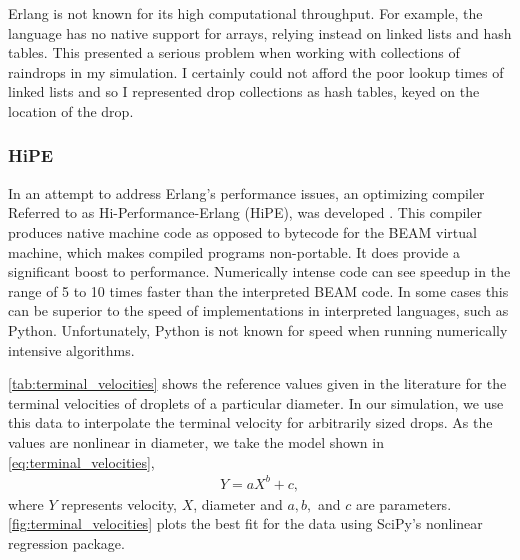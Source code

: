 \documentclass[twocolumn,a4paper,10pt]{article}
\begin{document}
Erlang is not known for its high computational throughput. For
example, the language has no native support for arrays, relying instead on
linked lists and hash tables. This presented a serious problem when working with
collections of raindrops in my simulation. I certainly could not afford the poor
lookup times of linked lists and so I represented drop collections as hash
tables, keyed on the location of the drop.

\subsubsection{HiPE}

In an attempt to address Erlang's performance issues, an optimizing compiler
Referred to as Hi-Performance-Erlang (HiPE), was developed \cite{hipe}. This
compiler produces native machine code as opposed to bytecode for the BEAM
virtual machine, which makes compiled programs non-portable. It does provide a
significant boost to performance. Numerically intense code can see speedup in
the range of 5 to 10 times faster than the interpreted BEAM code. In some cases
this can be superior to the speed of implementations in interpreted languages,
such as Python. Unfortunately, Python is not known for speed when running
numerically intensive algorithms.


\autoref{tab:terminal_velocities} shows the reference values given in the
literature for the terminal velocities of droplets of a particular diameter. In
our simulation, we use this data to interpolate the terminal velocity for
arbitrarily sized drops. As the values are nonlinear in diameter, we take the
model shown in \autoref{eq:terminal_velocities},
\begin{align}
    Y = aX^b + c,
    \label{eq:terminal_velocities}
\end{align}
where $Y$ represents velocity, $X$, diameter and $a, b,$ and $c$ are parameters.
\autoref{fig:terminal_velocities} plots the best fit for the data using SciPy's
nonlinear regression package\cite{scipy}.
\end{document}
